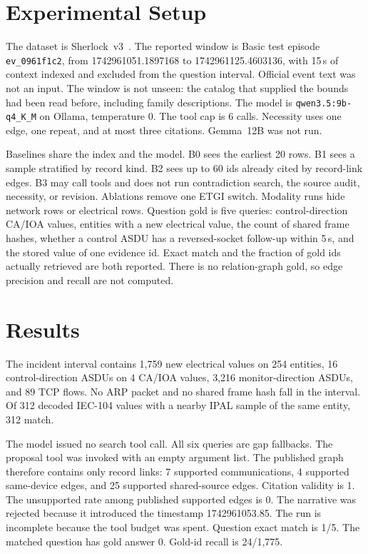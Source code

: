 \documentclass[conference]{IEEEtran}
\begin{document}
\section{Experimental Setup}
The dataset is Sherlock~v3~\cite{sherlockv3}.
The reported window is Basic test episode \texttt{ev\_0961f1c2}, from 1742961051.1897168 to 1742961125.4603136, with 15\,s of context indexed and excluded from the question interval.
Official event text was not an input.
The window is not unseen: the catalog that supplied the bounds had been read before, including family descriptions.
The model is \texttt{qwen3.5:9b-q4\_K\_M} on Ollama, temperature 0.
The tool cap is 6 calls.
Necessity uses one edge, one repeat, and at most three citations.
Gemma~12B was not run.

Baselines share the index and the model.
B0 sees the earliest 20 rows.
B1 sees a sample stratified by record kind.
B2 sees up to 60 ids already cited by record-link edges.
B3 may call tools and does not run contradiction search, the source audit, necessity, or revision.
Ablations remove one ETGI switch.
Modality runs hide network rows or electrical rows.
Question gold is five queries: control-direction CA/IOA values, entities with a new electrical value, the count of shared frame hashes, whether a control ASDU has a reversed-socket follow-up within 5\,s, and the stored value of one evidence id.
Exact match and the fraction of gold ids actually retrieved are both reported.
There is no relation-graph gold, so edge precision and recall are not computed.

\section{Results}
The incident interval contains 1,759 new electrical values on 254 entities, 16 control-direction ASDUs on 4 CA/IOA values, 3,216 monitor-direction ASDUs, and 89 TCP flows.
No ARP packet and no shared frame hash fall in the interval.
Of 312 decoded IEC-104 values with a nearby IPAL sample of the same entity, 312 match.

The model issued no search tool call.
All six queries are gap fallbacks.
The proposal tool was invoked with an empty argument list.
The published graph therefore contains only record links: 7 supported communications, 4 supported same-device edges, and 25 supported shared-source edges.
Citation validity is 1.
The unsupported rate among published supported edges is 0.
The narrative was rejected because it introduced the timestamp 1742961053.85.
The run is incomplete because the tool budget was spent.
Question exact match is 1/5.
The matched question has gold answer 0.
Gold-id recall is 24/1,775.
\end{document}
